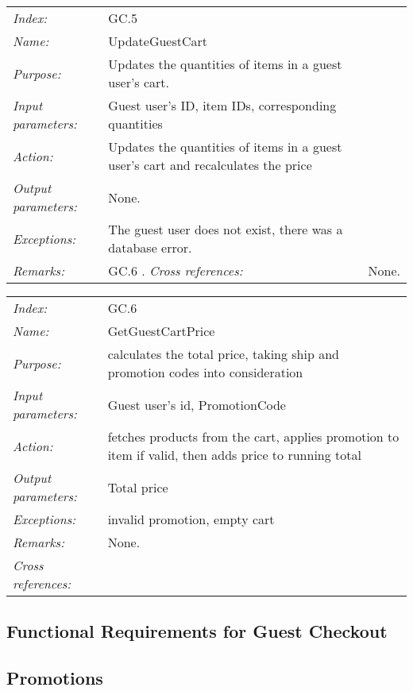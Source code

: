 \documentclass[10pt,letter]{article}
\begin{document}
\begin{tabularx}{\textwidth}{l X}
    \it{Index:} & GC.5 \\
    \it{Name:} & UpdateGuestCart \\
    \it{Purpose:} & Updates the quantities of items in a guest user's cart. \\
    \it{Input parameters:} & Guest user's ID, item IDs, corresponding quantities\\
    \it{Action:} & Updates the quantities of items in a guest user's cart and recalculates the price \\
    \it{Output parameters:} & None. \\
    \it{Exceptions:} & The guest user does not exist, there was a database error. \\
    \it{Remarks:} & GC.6 .
    \it{Cross references:} & None. \\
    \hline
\end{tabularx}

\begin{tabularx}{\textwidth}{l X}
    \it{Index:} & GC.6 \\
    \it{Name:} & GetGuestCartPrice \\
    \it{Purpose:} & calculates the total price, taking ship and promotion codes into consideration \\
    \it{Input parameters:} & Guest user's id, PromotionCode \\
    \it{Action:} &  fetches products from the cart, applies promotion to item if valid, then adds price to running total\\
    \it{Output parameters:} & Total price  \\
    \it{Exceptions:} &  invalid promotion, empty cart\\
    \it{Remarks:} & None. \\
    \it{Cross references:} & \\
    \hline
\end{tabularx}
\subsection{Functional Requirements for Guest Checkout}



\subsection{Promotions}
\end{document}
